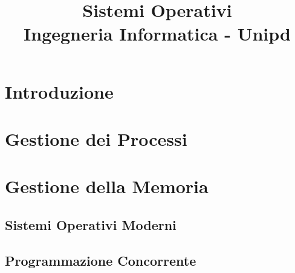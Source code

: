 \documentclass[a4paper,10pt]{report}
\title{\Huge \textbf{Sistemi Operativi}\\ \large Ingegneria Informatica - Unipd}
\date{}
\author{}
\begin{document}
\maketitle

\tableofcontents

\part{Introduzione}





\part{Gestione dei Processi}




\part{Gestione della Memoria}





\appendix
\chapter{Sistemi Operativi Moderni}


\chapter{Programmazione Concorrente}

\end{document}
